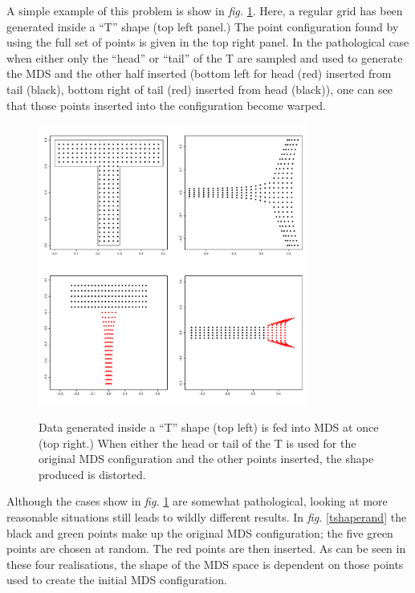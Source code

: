 \documentclass[a4paper,10pt]{article}
\newcommand{\fig}[1]{\emph{fig.} \ref{#1}}
\begin{document}
A simple example of this problem is show in \fig{tshape}. Here, a regular grid has been generated inside a ``T'' shape (top left panel.) The point configuration found by using the full set of points is given in the top right panel. In the pathological case when either only the ``head'' or ``tail'' of the T are sampled and used to generate the MDS and the other half inserted (bottom left for head (red) inserted from tail (black), bottom right of tail (red) inserted from head (black)), one can see that those points inserted into the configuration become warped. 

\begin{figure}
\centering
\includegraphics[width=3.5in]{figs/tshape.pdf} \\
\caption{Data generated inside a ``T'' shape (top left) is fed into MDS at once (top right.) When either the head or tail of the T is used for the original MDS configuration and the other points inserted, the shape produced is distorted.}
\label{tshape}
\end{figure}

Although the cases show in \fig{tshape} are somewhat pathological, looking at more reasonable situations still leads to wildly different results. In \fig{tshaperand} the black and green points make up the original MDS configuration; the five green points are chosen at random. The red points are then inserted. As can be seen in these four realisations, the shape of the MDS space is dependent on those points used to create the initial MDS configuration.
\end{document}
